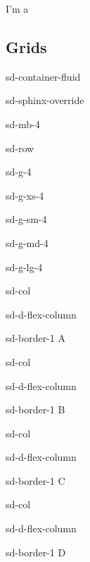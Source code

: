 \documentclass[letterpaper,10pt,english]{jupyterBook}
\begin{document}
\sphinxAtStartPar
I’m a 


\subsection{Grids}
\label{\detokenize{docs/02_04_Mas_cosas:grids}}
\begin{sphinxuseclass}{sd-container-fluid}
\begin{sphinxuseclass}{sd-sphinx-override}
\begin{sphinxuseclass}{sd-mb-4}
\begin{sphinxuseclass}{sd-row}
\begin{sphinxuseclass}{sd-g-4}
\begin{sphinxuseclass}{sd-g-xs-4}
\begin{sphinxuseclass}{sd-g-sm-4}
\begin{sphinxuseclass}{sd-g-md-4}
\begin{sphinxuseclass}{sd-g-lg-4}
\begin{sphinxuseclass}{sd-col}
\begin{sphinxuseclass}{sd-d-flex-column}
\begin{sphinxuseclass}{sd-border-1}
\sphinxAtStartPar
A

\end{sphinxuseclass}
\end{sphinxuseclass}
\end{sphinxuseclass}
\begin{sphinxuseclass}{sd-col}
\begin{sphinxuseclass}{sd-d-flex-column}
\begin{sphinxuseclass}{sd-border-1}
\sphinxAtStartPar
B

\end{sphinxuseclass}
\end{sphinxuseclass}
\end{sphinxuseclass}
\begin{sphinxuseclass}{sd-col}
\begin{sphinxuseclass}{sd-d-flex-column}
\begin{sphinxuseclass}{sd-border-1}
\sphinxAtStartPar
C

\end{sphinxuseclass}
\end{sphinxuseclass}
\end{sphinxuseclass}
\begin{sphinxuseclass}{sd-col}
\begin{sphinxuseclass}{sd-d-flex-column}
\begin{sphinxuseclass}{sd-border-1}
\sphinxAtStartPar
D


\end{sphinxuseclass}
\end{sphinxuseclass}
\end{sphinxuseclass}
\end{sphinxuseclass}
\end{sphinxuseclass}
\end{sphinxuseclass}
\end{sphinxuseclass}
\end{sphinxuseclass}
\end{sphinxuseclass}
\end{sphinxuseclass}
\end{sphinxuseclass}
\end{sphinxuseclass}
\end{document}
